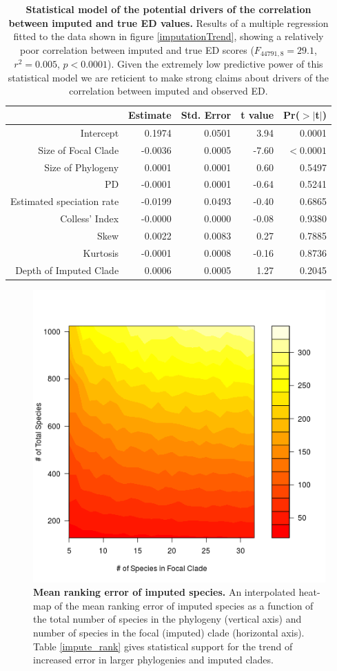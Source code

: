\documentclass[10pt,english]{article}
\begin{document}
\begin{table}[ht] 
\centering
\begin{tabular}{rrrrr}
  \hline
  & Estimate & Std. Error & t value & Pr($>$$|$t$|$) \\
   \hline
   Intercept & 0.1974 & 0.0501 & 3.94 & 0.0001 \\
   Size of Focal Clade & -0.0036 & 0.0005 & -7.60 & $<0.0001$ \\
   Size of Phylogeny & 0.0001 & 0.0001 & 0.60 & 0.5497 \\
   PD & -0.0001 & 0.0001 & -0.64 & 0.5241 \\
   Estimated speciation rate & -0.0199 & 0.0493 & -0.40 & 0.6865 \\
   Colless' Index & -0.0000 & 0.0000 & -0.08 & 0.9380 \\
   Skew & 0.0022 & 0.0083 & 0.27 & 0.7885 \\
   Kurtosis & -0.0001 & 0.0008 & -0.16 & 0.8736 \\
   Depth of Imputed Clade & 0.0006 & 0.0005 & 1.27 & 0.2045 \\ \hline
\end{tabular}
\caption{\textbf{Statistical model of the potential drivers of the
    correlation between imputed and true ED values.} Results of a
  multiple regression fitted to the data shown in figure
  \ref{imputationTrend}, showing a relatively poor correlation between
  imputed and true ED scores ($F_{44791,8} = 29.1$, $r^{2} =
  0.005$, $p <
  0.0001$). Given the extremely low predictive power of this
  statistical model we are reticient to make strong claims about
  drivers of the correlation between imputed and observed ED.}
\label{impute_reg}
\end{table}

\begin{figure}[!ht]
  \center
  \includegraphics[width=.5\textwidth]{rankingError.png}
  \caption{\textbf{Mean ranking error of imputed species.} An
    interpolated heat-map of the mean ranking error of imputed species
    as a function of the total number of species in the phylogeny
    (vertical axis) and number of species in the focal (imputed) clade
    (horizontal axis). Table \ref{impute_rank} gives statistical
    support for the trend of increased error in larger phylogenies and
    imputed clades.}
  \label{rankingError}
\end{figure}
\end{document}

